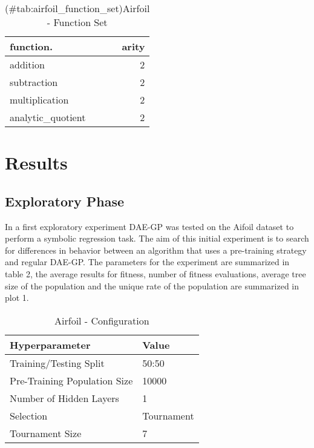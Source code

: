 \documentclass[
  11pt,
]{article}
\begin{document}
\begin{table}[!h]

\caption{(\#tab:airfoil_function_set)Airfoil - Function Set}
\centering
\begin{tabular}[t]{l|r}
\hline
\textbf{function.} & \textbf{arity}\\
\hline
addition & 2\\
\hline
subtraction & 2\\
\hline
multiplication & 2\\
\hline
analytic\_quotient & 2\\
\hline
\end{tabular}
\end{table}

\hypertarget{results}{%
\section{Results}\label{results}}

\hypertarget{exploratory-phase}{%
\subsection{Exploratory Phase}\label{exploratory-phase}}

In a first exploratory experiment DAE-GP was tested on the Aifoil dataset to perform a symbolic regression task. The aim of this initial experiment is to search for differences in behavior between an algorithm that uses a pre-training strategy and regular DAE-GP. The parameters for the experiment are summarized in table 2, the average results for fitness, number of fitness evaluations, average tree size of the population and the unique rate of the population are summarized in plot 1.

\begin{table}[!h]

\caption{\label{tab:unnamed-chunk-1}Airfoil - Configuration}
\centering
\begin{tabular}[t]{l|l}
\hline
\textbf{Hyperparameter} & \textbf{Value}\\
\hline
Training/Testing Split & 50:50\\
\hline
Pre-Training Population Size & 10000\\
\hline
Number of Hidden Layers & 1\\
\hline
Selection & Tournament\\
\hline
Tournament Size & 7\\
\hline
\end{tabular}
\end{table}
\end{document}
